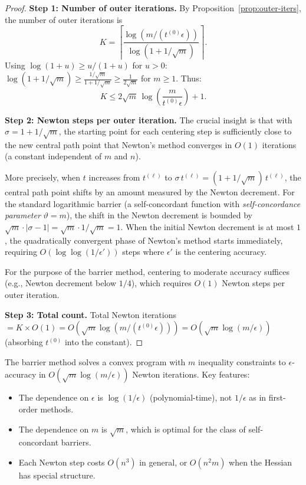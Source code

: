 \documentclass[11pt,a4paper]{article}
\begin{document}
\begin{proof}
\textbf{Step 1: Number of outer iterations.}
By Proposition~\ref{prop:outer-iters}, the number of outer iterations
is
\begin{equation}\label{eq:outer-count}
  K = \left\lceil
  \frac{\log(m/(t^{(0)}\epsilon))}{\log(1 + 1/\sqrt{m})}
  \right\rceil.
\end{equation}
Using $\log(1 + u) \ge u/(1+u)$ for $u > 0$:
$\log(1 + 1/\sqrt{m}) \ge \frac{1/\sqrt{m}}{1 + 1/\sqrt{m}}
\ge \frac{1}{2\sqrt{m}}$ for $m \ge 1$. Thus:
\begin{equation}\label{eq:outer-bound}
  K \le 2\sqrt{m}\,\log\!\left(\frac{m}{t^{(0)}\epsilon}\right) + 1.
\end{equation}

\textbf{Step 2: Newton steps per outer iteration.}
The crucial insight is that with $\sigma = 1 + 1/\sqrt{m}$, the
starting point for each centering step is sufficiently close to the
new central path point that Newton's method converges in $O(1)$
iterations (a constant independent of $m$ and $n$).

More precisely, when $t$ increases from $t^{(\ell)}$ to
$\sigma\,t^{(\ell)} = (1 + 1/\sqrt{m})\,t^{(\ell)}$, the central
path point shifts by an amount measured by the Newton decrement. For
the standard logarithmic barrier (a self-concordant function with
\emph{self-concordance parameter} $\vartheta = m$), the shift in the
Newton decrement is bounded by $\sqrt{m} \cdot |\sigma - 1|
= \sqrt{m} \cdot 1/\sqrt{m} = 1$. When the initial Newton decrement
is at most $1$, the quadratically convergent phase of Newton's method
starts immediately, requiring $O(\log\log(1/\epsilon'))$ steps where
$\epsilon'$ is the centering accuracy.

For the purpose of the barrier method, centering to moderate accuracy
suffices (e.g., Newton decrement below $1/4$), which requires
$O(1)$ Newton steps per outer iteration.

\textbf{Step 3: Total count.}
Total Newton iterations $= K \times O(1)
= O(\sqrt{m}\log(m/(t^{(0)}\epsilon)))
= O(\sqrt{m}\log(m/\epsilon))$
(absorbing $t^{(0)}$ into the constant).
\end{proof}

\begin{keyresult}[title={Barrier Method Complexity}]
The barrier method solves a convex program with $m$ inequality
constraints to $\epsilon$-accuracy in
$O(\sqrt{m}\log(m/\epsilon))$ Newton iterations.
Key features:
\begin{itemize}
  \item The dependence on $\epsilon$ is $\log(1/\epsilon)$
    (polynomial-time), not $1/\epsilon$ as in first-order methods.
  \item The dependence on $m$ is $\sqrt{m}$, which is optimal for
    the class of self-concordant barriers.
  \item Each Newton step costs $O(n^3)$ in general, or $O(n^2 m)$
    when the Hessian has special structure.
\end{itemize}
\end{keyresult}
\end{document}
